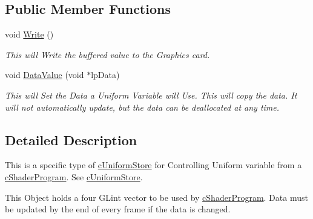 \subsection*{Public Member Functions}
\begin{DoxyCompactItemize}
\item 
\hypertarget{classc_uniform_int_vector4_aca001368a59000939d043cc6b1249e67}{
void \hyperlink{classc_uniform_int_vector4_aca001368a59000939d043cc6b1249e67}{Write} ()}
\label{classc_uniform_int_vector4_aca001368a59000939d043cc6b1249e67}

\begin{DoxyCompactList}\small\item\em This will Write the buffered value to the Graphics card. \end{DoxyCompactList}\item 
\hypertarget{classc_uniform_int_vector4_ac6a5a0ae5a4d871b4666b2d5a3c1ebac}{
void \hyperlink{classc_uniform_int_vector4_ac6a5a0ae5a4d871b4666b2d5a3c1ebac}{DataValue} (void $\ast$lpData)}
\label{classc_uniform_int_vector4_ac6a5a0ae5a4d871b4666b2d5a3c1ebac}

\begin{DoxyCompactList}\small\item\em This will Set the Data a Uniform Variable will Use. This will copy the data. It will not automatically update, but the data can be deallocated at any time. \end{DoxyCompactList}\end{DoxyCompactItemize}


\subsection{Detailed Description}
This is a specific type of \hyperlink{classc_uniform_store}{cUniformStore} for Controlling Uniform variable from a \hyperlink{classc_shader_program}{cShaderProgram}. See \hyperlink{classc_uniform_store}{cUniformStore}. 

This Object holds a four GLint vector to be used by \hyperlink{classc_shader_program}{cShaderProgram}. Data must be updated by the end of every frame if the data is changed. 